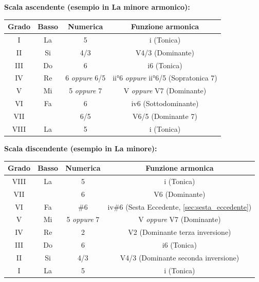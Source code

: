 \begin{regola}
	\label{reg:regola_ottava_completa_minore}
	
	\textbf{Scala ascendente (esempio in La minore armonico):}
	
	\begin{tabular}{|c|c|c|c|}
		\hline
		\textbf{Grado} & \textbf{Basso} & \textbf{Numerica} & \textbf{Funzione armonica} \\
		\hline
		I & La & 5 & i (Tonica) \\
		II & Si & 4/3 & V4/3 (Dominante) \\
		III & Do & 6 & i6 (Tonica) \\
		IV & Re & 6 \textit{oppure} 6/5 & ii°6 \textit{oppure} ii°6/5 (Sopratonica 7) \\
		V & Mi & 5 \textit{oppure} 7 & V \textit{oppure} V7 (Dominante) \\
		VI & Fa & 6 & iv6 (Sottodominante) \\
		VII & \Soldiesis  & 6/5 & V6/5 (Dominante 7) \\
		VIII & La & 5 & i (Tonica) \\
		\hline
	\end{tabular}
	
	\vspace{0.5cm}
	
	\textbf{Scala discendente (esempio in La minore):}
	
	\begin{tabular}{|c|c|c|c|}
		\hline
		\textbf{Grado} & \textbf{Basso} & \textbf{Numerica} & \textbf{Funzione armonica} \\
		\hline
		VIII & La & 5 & i (Tonica) \\
		VII & \Soldiesis  & 6 & V6 (Dominante) \\
		VI & Fa & \#6 & iv\#6 (Sesta Eccedente, \ref{sec:sesta_eccedente}) \\
		V & Mi & 5 \textit{oppure} 7 & V \textit{oppure} V7 (Dominante) \\
		IV & Re & 2 & V2 (Dominante terza inversione) \\
		III & Do & 6 & i6 (Tonica) \\
		II & Si & 4/3 & V4/3 (Dominante seconda inversione) \\
		I & La & 5 & i (Tonica) \\
		\hline
	\end{tabular}
\end{regola}

\begin{esempio}
	\label{ex:regola_completa_asc_min}
\end{esempio}

